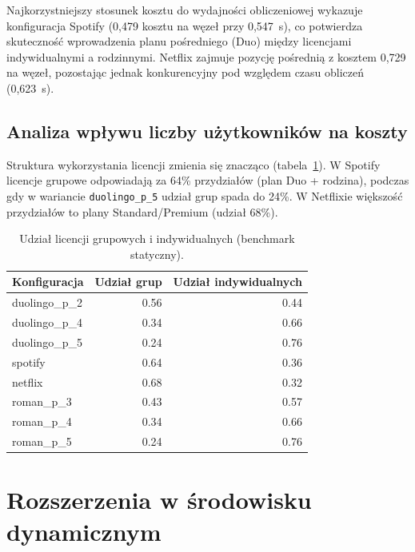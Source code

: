 Najkorzystniejszy stosunek kosztu do wydajności obliczeniowej wykazuje konfiguracja Spotify (0,479 kosztu na węzeł przy 0,547~s), co potwierdza skuteczność wprowadzenia planu pośredniego (Duo) między licencjami indywidualnymi a rodzinnymi. Netflix zajmuje pozycję pośrednią z kosztem 0,729 na węzeł, pozostając jednak konkurencyjny pod względem czasu obliczeń (0,623~s).

\subsection{Analiza wpływu liczby użytkowników na koszty}

Struktura wykorzystania licencji zmienia się znacząco (tabela~\ref{tab:ext-license-mix}). W Spotify licencje grupowe odpowiadają za 64\% przydziałów (plan Duo + rodzina), podczas gdy w wariancie \texttt{duolingo\_p\_5} udział grup spada do 24\%. W Netflixie większość przydziałów to plany Standard/Premium (udział 68\%).

\begin{table}[H]
  \centering
  \caption{Udział licencji grupowych i indywidualnych (benchmark statyczny).}
  \label{tab:ext-license-mix}
  \begin{tabular}{lrr}
    \toprule
    \textbf{Konfiguracja} & \textbf{Udział grup} & \textbf{Udział indywidualnych} \\
    \midrule
    duolingo\_p\_2        & 0.56                 & 0.44                           \\
    duolingo\_p\_4        & 0.34                 & 0.66                           \\
    duolingo\_p\_5        & 0.24                 & 0.76                           \\
    spotify               & 0.64                 & 0.36                           \\
    netflix               & 0.68                 & 0.32                           \\
    roman\_p\_3           & 0.43                 & 0.57                           \\
    roman\_p\_4           & 0.34                 & 0.66                           \\
    roman\_p\_5           & 0.24                 & 0.76                           \\
    \bottomrule
  \end{tabular}
\end{table}


\section{Rozszerzenia w środowisku dynamicznym}

